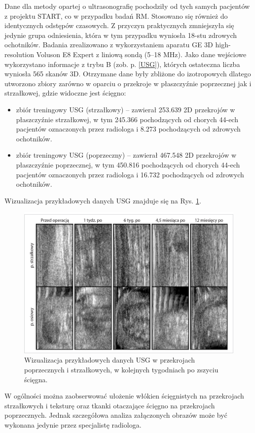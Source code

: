 Dane dla metody opartej o ultrasonografię pochodziły od tych samych pacjentów z projektu START, co w przypadku badań RM. Stosowano się również do identycznych odstępów czasowych. Z przyczyn praktycznych zmniejszyła się jedynie grupa odniesienia, która w tym przypadku wyniosła 18-stu zdrowych ochotników. Badania zrealizowano z wykorzystaniem aparatu GE 3D high-resolution Voluson E8 Expert z liniową sondą (5--18 MHz). Jako dane wejściowe wykorzystano informacje z trybu B (zob. p. \ref{USG}), których ostateczna liczba wyniosła 565 skanów 3D. Otrzymane dane były zbliżone do izotropowych dlatego utworzono zbiory zarówno w oparciu \linebreak o przekroje w płaszczyźnie poprzecznej jak i strzałkowej, gdzie widoczne jest ścięgno:
\begin{itemize}[noitemsep,nolistsep]
	\item zbiór treningowy USG (strzałkowy) -- zawierał 253.639 2D przekrojów w płaszczyźnie strzałkowej, w tym 245.366 pochodzących od chorych 44-ech pacjentów oznaczonych przez radiologa i 8.273 pochodzących od zdrowych ochotników.
	\item zbiór treningowy USG (poprzeczny) -- zawierał 467.548 2D przekrojów w płaszczyźnie poprzecznej, w tym 450.816 pochodzących od chorych 44-ech pacjentów oznaczonych przez radiologa i 16.732 pochodzących od zdrowych ochotników. 
\end{itemize}

Wizualizacja przykładowych danych USG znajduje się na Rys. \ref{fig:US_sample}.
\begin{figure}[t!]
	\includegraphics[width=\textwidth]{figures/Data_US_sample.jpg}
	\caption{Wizualizacja przykładowych danych USG w przekrojach poprzecznych i strzałkowych, w kolejnych tygodniach po zszyciu ścięgna.}
	\label{fig:US_sample}
\end{figure}
W ogólności można zaobserwować ułożenie włókien ścięgnistych na przekrojach strzałkowych \linebreak i teksturę oraz tkanki otaczające ścięgno na przekrojach poprzecznych. Jednak szczegółowa analiza załączonych obrazów może być wykonana jedynie przez specjalistę radiologa. 


